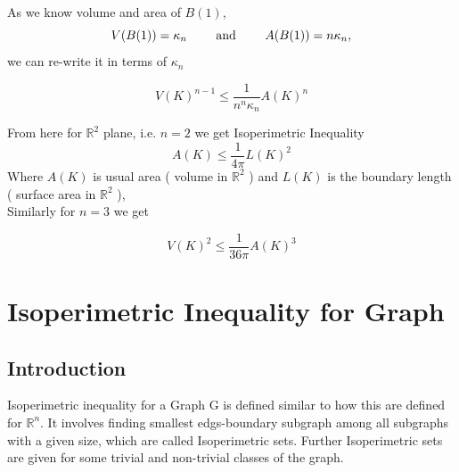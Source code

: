 \documentclass[oneside]{book}
\begin{document}
	As we know volume and area of $B(1)$, 
	$$V(B(1))=\kappa_{n} \text{  \quad \quad and \quad \quad   } A(B(1))=n \kappa_{n},$$
	we can re-write it  in terms of $\kappa_{n}$
	
	\[
	V(K)^{n-1} \leq \frac{1}{n^{n} \kappa_{n}} A(K)^{n}
	\]
	\hfill \break
	
	From here for $\mathbb{R}^{2}$ plane, i.e. $n=2$ we get Isoperimetric Inequality  
	\[
	A(K) \leq \frac{1}{4 \pi} L(K)^{2}
	\]
	Where  $A(K)$ is usual  area ( volume in $\mathbb{R}^{2}$ ) and $L(K)$ is the boundary length \newline  ( surface area in $\mathbb{R}^{2}$ ), \\
	
	Similarly  for $n=3$
	we get
	
	\[
	V(K)^{2} \leq \frac{1}{36 \pi} A(K)^{3}
	\]
	
	
	
	
	
	
	
	
	
	
	
	\chapter{Isoperimetric Inequality for Graph}
	\label{chap:c5}
	\section{Introduction}
	\label{s:5}
	
	
	
	
	
	
	
	
	Isoperimetric inequality for a Graph G is defined similar to how this are defined for $\mathbb{R}^n$. It involves finding smallest edgs-boundary subgraph among all subgraphs with a given size, which are called Isoperimetric sets. Further Isoperimetric sets are given for some trivial and non-trivial classes of the graph. \par 
%	
	\hfill \break
	
\end{document}
